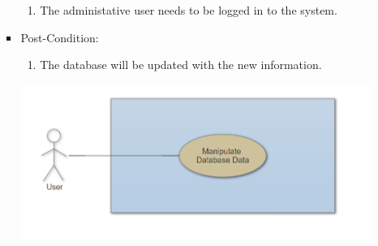 \documentclass[a4paper,10pt]{article}
\begin{document}
\begin{enumerate}
\begin{itemize}
\begin{itemize}
					\begin{enumerate}	
						\item The administative user needs to be logged in to the system. 
					\end{enumerate}
				\item Post-Condition:
					\begin{enumerate}
						\item The database will be updated with the new information. 
					\end{enumerate}
		 \includegraphics[scale=0.62]{Diagrams/ManipulateDatabaseUseCase.png}\\


\end{itemize}
\end{itemize}
\end{enumerate}
\end{document}
